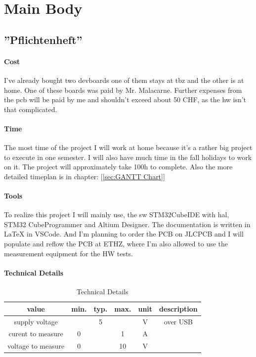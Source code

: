 \chapter{Main Body}
\label{cha:Main Body}


\section{''Pflichtenheft''}
\label{sec:Pflichtenheft}

\subsubsection{Cost}
I've already bought two \acs{devboard}s one of them stays at \acs{tbz} and the other is at home. One of these boards was paid by Mr. Malacarne. Further expenses from the \acs{pcb} will be paid by me and shouldn't exceed about 50 CHF, as the \acs{hw} isn't that complicated.

\subsubsection{Time}
The most time of the project I will work at home because it's a rather big project to execute in one semester. I will also have much time in the fall holidays to work on it. The project will approximately take 100h to complete. Also the more detailed timeplan is in chapter: [\ref{sec:GANTT Chart}]

\subsubsection{Tools}
To realize this project I will mainly use, the \acs{sw} STM32CubeIDE with \acs{hal}, STM32 CubeProgrammer and Altium Designer. The documentation is written in LaTeX in VSCode. And I'm planning to order the PCB on JLCPCB and I will populate and reflow the PCB at ETHZ, where I'm also allowed to use the measurement equipment for the HW tests.

\subsubsection{Technical Details}
\begin{table}[H]
    \centering
    \label{tab:Technical Details}
\begin{tabular}{||c || c | c | c | c  || c ||} 
 \hline
 value &  min. & typ. & max. & unit & description \\ [0.5ex] 
 \hline\hline
  supply voltage & & 5 & & V & over USB \\ 
 \hline
 curent to measure & 0 & & 1 & A & \\ 
 \hline
 voltage to measure & 0 & & 10 & V & \\ 
 \hline
\end{tabular}
    \caption{Technical Details}
\end{table}

